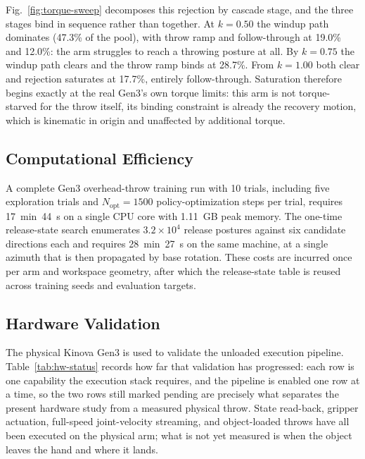 \documentclass[letterpaper, 10 pt, conference]{ieeeconf}
\begin{document}
Fig.~\ref{fig:torque-sweep} decomposes this rejection by cascade stage, and the
three stages bind in sequence rather than together. At $k=0.50$ the windup path
dominates (47.3\% of the pool), with throw ramp and follow-through at 19.0\% and
12.0\%: the arm struggles to reach a throwing posture at all. By $k=0.75$ the
windup path clears and the throw ramp binds at 28.7\%. From $k=1.00$ both clear
and rejection saturates at 17.7\%, entirely follow-through. Saturation therefore
begins exactly at the real Gen3's own torque limits: this arm is not
torque-starved for the throw itself, its binding constraint is already the
recovery motion, which is kinematic in origin and unaffected by additional
torque.


\subsection{Computational Efficiency}
\label{sec:results-cost}

A complete Gen3 overhead-throw training run with 10 trials, including five
exploration trials and $N_{\mathrm{opt}}=1500$ policy-optimization steps per
trial, requires 17~min~44~s on a single CPU core with 1.11~GB peak memory. The
one-time release-state search enumerates $3.2\times10^{4}$ release postures
against six candidate directions each and requires 28~min~27~s on the same
machine, at a single azimuth that is then propagated by base rotation. These
costs are incurred once per arm and workspace geometry, after which the
release-state table is reused across training seeds and evaluation targets.


\subsection{Hardware Validation}
\label{sec:results-hw}

The physical Kinova Gen3 is used to validate the unloaded execution pipeline.
Table~\ref{tab:hw-status} records how far that validation has progressed: each
row is one capability the execution stack requires, and the pipeline is
enabled one row at a time, so the two rows still marked pending are precisely
what separates the present hardware study from a measured physical throw.
State read-back, gripper actuation, full-speed joint-velocity streaming, and
object-loaded throws have all been executed on the physical arm; what is not yet
measured is when the object leaves the hand and where it lands.
\end{document}
